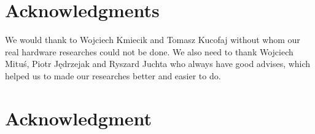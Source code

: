 \documentclass[conference,compsoc]{IEEEtran}
\begin{document}
\ifCLASSOPTIONcompsoc
  \section*{Acknowledgments}
We would thank to Wojciech Kmiecik and Tomasz Kucofaj without whom our real hardware researches could not be done. We also need to thank Wojciech Mituś, Piotr Jędrzejak and Ryszard Juchta who always have good advises, which helped us to made our researches better and easier to do.
\else
  \section*{Acknowledgment}
\fi






\end{document}
